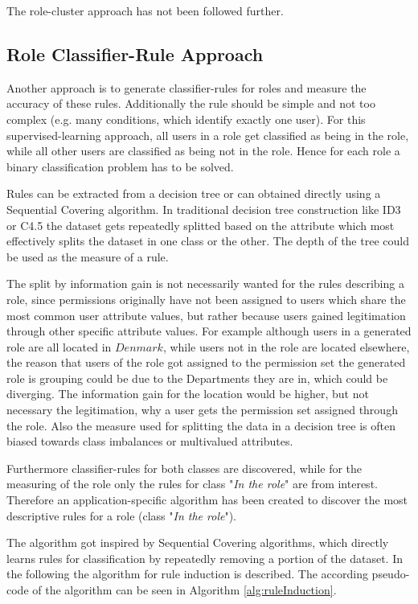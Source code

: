         The role-cluster approach has not been followed further.
        
        \subsection{Role Classifier-Rule Approach}
        \label{sec:classifierRule}
        Another approach is to generate classifier-rules for roles and measure the accuracy of these rules. Additionally the rule should be simple and not too complex (e.g. many conditions, which identify exactly one user). For this supervised-learning approach, all users in a role get classified as being in the role, while all other users are classified as being not in the role. Hence for each role a binary classification problem has to be solved.
        
        Rules can be extracted from a decision tree or can obtained directly using a Sequential Covering algorithm\cite{Han}. In traditional decision tree construction like ID3 or C4.5 the dataset gets repeatedly splitted based on the attribute which most effectively splits the dataset in one class or the other. The depth of the tree could be used as the measure of a rule.
        
        The split by information gain is not necessarily wanted for the rules describing a role, since permissions originally have not been assigned to users which share the most common user attribute values, but rather because users gained legitimation through other specific attribute values. For example although users in a generated role are all located in $Denmark$, while users not in the role are located elsewhere, the reason that users of the role got assigned to the permission set the generated role is grouping could be due to the Departments they are in, which could be diverging. The information gain for the location would be higher, but not necessary the legitimation, why a user gets the permission set assigned through the role. Also the measure used for splitting the data in a decision tree is often biased towards class imbalances or multivalued attributes\cite{Han}.
        
        Furthermore classifier-rules for both classes are discovered, while for the measuring of the role only the rules for class "\textit{In the role}" are from interest. Therefore an application-specific algorithm has been created to discover the most descriptive rules for a role (class "\textit{In the role}").
        
        The algorithm got inspired by Sequential Covering algorithms, which directly learns rules for classification by repeatedly removing a portion of the dataset. In the following the algorithm for rule induction is described. The according pseudo-code of the algorithm can be seen in Algorithm \ref{alg:ruleInduction}.        
        
